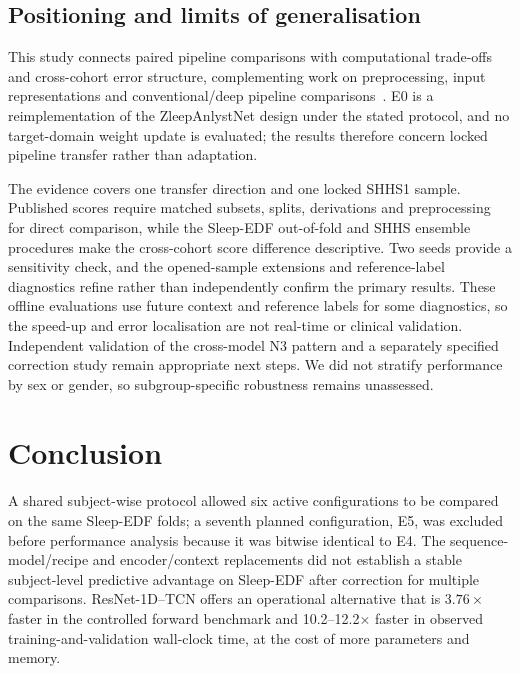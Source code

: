 \documentclass[11pt,a4paper]{article}
\begin{document}
\subsection{Positioning and limits of generalisation}

This study connects paired pipeline comparisons with computational trade-offs and cross-cohort error
structure, complementing work on preprocessing, input representations and conventional/deep pipeline
comparisons~\cite{haghayegh2023sleepinceptionnet,vdd2023traditional}. E0 is a reimplementation of the
ZleepAnlystNet design under the stated protocol, and no target-domain weight update is evaluated; the
results therefore concern locked pipeline transfer rather than adaptation.

The evidence covers one transfer direction and one locked SHHS1 sample. Published scores require matched
subsets, splits, derivations and preprocessing for direct comparison, while the Sleep-EDF out-of-fold and
SHHS ensemble procedures make the cross-cohort score difference descriptive. Two seeds provide a
sensitivity check, and the opened-sample extensions and reference-label diagnostics refine rather than
independently confirm the primary results. These offline evaluations use future context and reference
labels for some diagnostics, so the speed-up and error localisation are not real-time or clinical
validation. Independent validation of the cross-model N3 pattern and a separately specified correction
study remain appropriate next steps. We did not stratify performance by sex or gender, so subgroup-specific
robustness remains unassessed.

\section{Conclusion}

A shared subject-wise protocol allowed six active configurations to be compared on the same Sleep-EDF
folds; a seventh planned configuration, E5, was excluded before performance analysis because it was
bitwise identical to E4.
The sequence-model/recipe and encoder/context replacements did not establish a stable subject-level
predictive advantage on Sleep-EDF after correction for multiple comparisons. ResNet-1D--TCN offers an operational alternative that is
$3.76\times$ faster in the controlled forward benchmark and 10.2--12.2$\times$ faster in observed
training-and-validation wall-clock time, at the cost of more parameters and memory.
\end{document}

